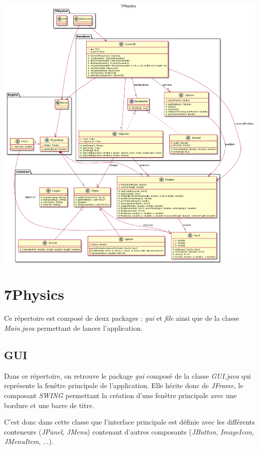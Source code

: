 \documentclass[11pt]{report}
\begin{document}
\begin{center}
  \includegraphics[width=18cm]{./diagramme_classe.png}
\end{center}

\section{7Physics}

Ce répertoire est composé de deux packages : \textit{gui} et \textit{file} ainsi que de la classe \textit{Main.java} permettant de lancer l'application.

\subsection{GUI}
Dans ce répertoire, on retrouve le package \textit{gui} composé de la classe \textit{GUI.java} qui représente la fenêtre principale de l'application. Elle hérite donc de \textit{JFrame}, le composant \textit{SWING} permettant la création d'une fenêtre principale avec une bordure et une barre de titre.

C'est donc dans cette classe que l'interface principale est définie avec les différents conteneurs (\textit{JPanel}, \textit{JMenu}) contenant d'autres composants (\textit{JButton}, \textit{ImageIcon}, \textit{JMenuItem}, ...).
\end{document}

